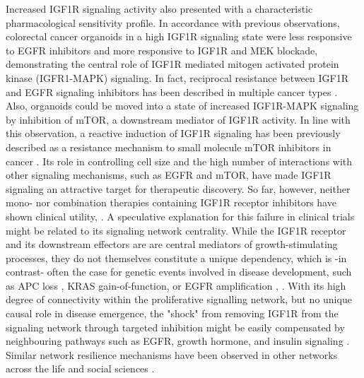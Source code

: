 \begin{flushleft}
Increased IGF1R signaling activity also presented with a characteristic pharmacological sensitivity profile. In accordance with previous observations\citep{yaoCombinedIGF1RMEK2016}, colorectal cancer organoids in a high IGF1R signaling state were less responsive to EGFR inhibitors and more responsive to IGF1R and MEK blockade, demonstrating the central role of IGF1R mediated mitogen activated protein kinase (IGFR1-MAPK) signaling. In fact, reciprocal resistance between IGF1R and EGFR signaling inhibitors has been described in multiple cancer types \citep{huaInsulinlikeGrowthFactor2020a}. Also, organoids could be moved into a state of increased IGF1R-MAPK signaling by inhibition of mTOR, a downstream mediator of IGF1R activity. In line with this observation, a reactive induction of IGF1R signaling has been previously described as a resistance mechanism to small molecule mTOR inhibitors in cancer \citep{sharma_chromatin-mediated_2010, yoonFocalAdhesionIGF1RDependent2017a}. Its role in controlling cell size and the high number of interactions with other signaling mechanisms, such as EGFR and mTOR, have made IGF1R signaling an attractive target for therapeutic discovery. So far, however, neither mono- nor combination therapies containing IGF1R receptor inhibitors have shown clinical utility\citep{beckwithMinireviewWereIGF2015}, \citep{CostsCausesOncologya}. A speculative explanation for this failure in clinical trials might be related to its signaling network centrality. While the IGF1R receptor and its downstream effectors are are central mediators of growth-stimulating processes, they do not themselves constitute a unique dependency, which is -in contrast- often the case for genetic events involved in disease development, such as APC loss \citep{Dow2015-pc}, KRAS gain-of-function, or EGFR amplification \citep{katoRevisitingEpidermalGrowth2019}, \citep{randonEGFRAmplificationMetastatic2021}. With its high degree of connectivity within the proliferative signalling network, but no unique causal role in disease emergence, the "shock" from removing IGF1R from the signaling network through targeted inhibition might be easily compensated by neighbouring pathways such as EGFR, growth hormone, and insulin signaling \citep{beckwithMinireviewWereIGF2015}. Similar network resilience mechanisms have been observed in other networks across the life and social sciences \citep{liuNetworkResilience2022a}.
\par


\end{flushleft}
